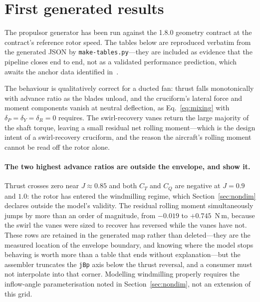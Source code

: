 \documentclass[11pt,a4paper]{article}
\newcommand{\varid}[1]{\texttt{\small #1}}
\begin{document}
\section{First generated results}

The propulsor generator has been run against the 1.8.0 geometry contract
at the contract's reference rotor speed. The tables below are reproduced
verbatim from the generated JSON by \texttt{make-tables.py}---they are
included as evidence that the pipeline closes end to end, not as a
validated performance prediction, which awaits the anchor data identified
in~\cite{scitech}.



\noindent
The behaviour is qualitatively correct for a ducted fan: thrust falls
monotonically with advance ratio as the blades unload, and the
cruciform's lateral force and moment components vanish at neutral
deflection, as Eq.~\eqref{eq:mixing} with $\delta_P = \delta_Y =
\delta_R = 0$ requires. The swirl-recovery vanes return the large
majority of the shaft torque, leaving a small residual net rolling
moment---which is the design intent of a swirl-recovery cruciform, and
the reason the aircraft's rolling moment cannot be read off the rotor
alone.

\paragraph{The two highest advance ratios are outside the envelope, and
show it.} Thrust crosses zero near $J \approx 0.85$ and both $C_T$ and
$C_Q$ are negative at $J = 0.9$ and $1.0$: the rotor has entered the
windmilling regime, which Section~\ref{sec:nondim} declares outside the
model's validity. The residual rolling moment simultaneously jumps by
more than an order of magnitude, from $-0.019$ to $+0.745$~N\,m, because
the swirl the vanes were sized to recover has reversed while the vanes
have not. These rows are retained in the generated map rather than
deleted---they are the measured location of the envelope boundary, and
knowing where the model stops behaving is worth more than a table that
ends without explanation---but the assembler truncates the \varid{jBp}
axis below the thrust reversal, and a consumer must not interpolate into
that corner. Modelling windmilling properly requires the
inflow-angle parameterisation noted in Section~\ref{sec:nondim}, not an
extension of this grid.
\end{document}

